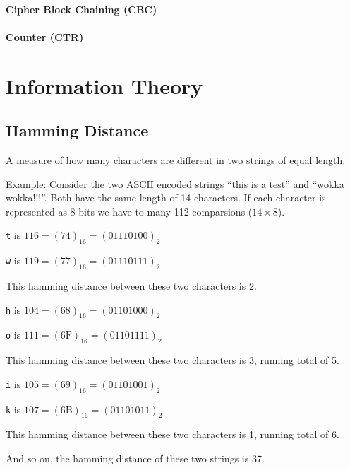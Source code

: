 \documentclass[10pt]{book}
\begin{document}
  \subsubsection{Cipher Block Chaining (CBC)}

  \subsubsection{Counter (CTR)}

  \chapter{Information Theory}

  \section{Hamming Distance}

  A measure of how many characters are different in two strings of equal length.

  Example: Consider the two ASCII encoded strings ``this is a test'' and ``wokka
  wokka!!!''. Both have the same length of 14 characters. If each character is
  represented as 8 bits we have to many 112 comparsions ($14 \times 8$).

  \texttt{t} is $116 = (74)_{16} = (01110100)_{2}$

  \texttt{w} is $119 = (77)_{16} = (01110111)_{2}$

  This hamming distance between these two characters is 2.

  \texttt{h} is $104 = (68)_{16} = (01101000)_{2}$

  \texttt{o} is $111 = (6\text{F})_{16} = (01101111)_{2}$

  This hamming distance between these two characters is 3, running total of 5.

  \texttt{i} is $105 = (69)_{16} = (01101001)_{2}$

  \texttt{k} is $107 = (6\text{B})_{16} = (01101011)_{2}$

  This hamming distance between these two characters is 1, running total of 6.

  And so on, the hamming distance of these two strings is 37.
\end{document}
